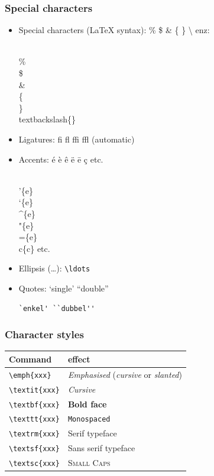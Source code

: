 \documentclass{beamer}
\begin{document}
\begin{frame}[fragile]
  \frametitle{Special characters}
  
  \begin{itemize}
  \item<+-> Special characters ({\LaTeX} syntax): \% \$ \& \{ \} \textbackslash{} enz: \\
\begin{semiverbatim}
\\\% \\\$ \\\& \\\{ \\\} \\textbackslash\{\}
\end{semiverbatim}
  \item<+-> Ligatures: \textrm{fi fl ffi ffl} (automatic)
  \item<+-> Accents: \'{e} \`{e} \^{e} \"{e} \={e} \c{c} etc.
\begin{semiverbatim}
\\'\{e\} \\`\{e\} \\^\{e\} \\"\{e\} \\=\{e\} \\c\{c\} etc.
\end{semiverbatim}
  \item<+-> Ellipsis (\ldots): \texttt{\textbackslash{}ldots}
  \item<+-> Quotes: `single' ``double''
\begin{verbatim}
`enkel' ``dubbel''
\end{verbatim}
  \end{itemize}
\end{frame}

\begin{frame}[fragile]
  \frametitle{Character styles}
  
  \begin{center}
  \begin{tabular}{ll}
    \hline
    Command & effect \\
    \hline
    \verb?\emph{xxx}?   & \emph{Emphasised} (\textrm{\emph{cursive}} or \textsf{\emph{slanted}})\\
    \verb?\textit{xxx}? & \textit{Cursive} \\
    \verb?\textbf{xxx}? & \textbf{Bold face} \\    
    \verb?\texttt{xxx}? & \texttt{Monospaced} \\
    \verb?\textrm{xxx}? & \textrm{Serif typeface}  \\
    \verb?\textsf{xxx}? & \textsf{Sans serif typeface}  \\
    \verb?\textsc{xxx}? & \textsc{Small Caps} \\
  \end{tabular}
  \end{center}

\end{frame}
\end{document}

